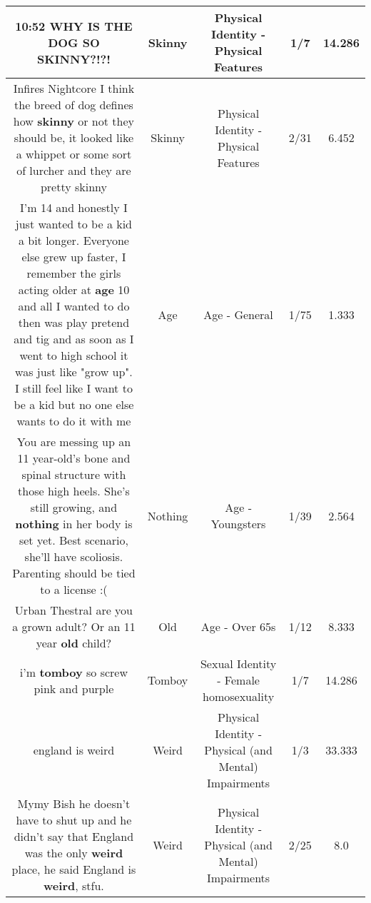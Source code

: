 \documentclass[11pt]{article}
\newlength\mylength
\begin{document}
\begin{center}
\begin{longtable}{|C{.65\mylength}|C{.30\mylength}|C{.12\mylength}|C{.12\mylength}|C{.12\mylength}|}
  \small 10:52 WHY IS THE DOG SO \textbf{SKINNY}?!?!\normalsize   & Skinny & Physical Identity - Physical Features & 1/7 & 14.286 \\  \hline
  \small Infires Nightcore I think the breed of dog defines how \textbf{skinny} or not they should be, it looked like a whippet or some sort of lurcher and they are pretty skinny\normalsize   & Skinny & Physical Identity - Physical Features & 2/31 & 6.452 \\  \hline
  \small I'm 14 and honestly I just wanted to be a kid a bit longer. Everyone else grew up faster, I remember the girls acting older at \textbf{age} 10 and all I wanted to do then was play pretend and tig and as soon as I went to high school it was just like "grow up". I still feel like I want to be a kid but no one else wants to do it with me\normalsize   & Age & Age - General & 1/75 & 1.333 \\  \hline
  \small You are messing up an 11 year-old's bone and spinal structure with those high heels. She's still growing, and \textbf{nothing} in her body is set yet. Best scenario, she'll have scoliosis. Parenting should be tied to a license :(\normalsize   & Nothing & Age - Youngsters & 1/39 & 2.564 \\  \hline
  \small Urban Thestral are you a grown adult? Or an 11 year \textbf{old} child?\normalsize   & Old & Age - Over 65s & 1/12 & 8.333 \\  \hline
  \small i'm \textbf{tomboy} so screw pink and purple\normalsize   & Tomboy & Sexual Identity - Female homosexuality & 1/7 & 14.286 \\  \hline
  \small england is weird\normalsize   & Weird & Physical Identity - Physical (and Mental) Impairments & 1/3 & 33.333 \\  \hline
  \small Mymy Bish he doesn't have to shut up and he didn't say that England was the only \textbf{weird} place, he said England is \textbf{weird}, stfu.\normalsize   & Weird & Physical Identity - Physical (and Mental) Impairments & 2/25 & 8.0 \\  \hline

\end{longtable}
\end{center}
\end{document}
